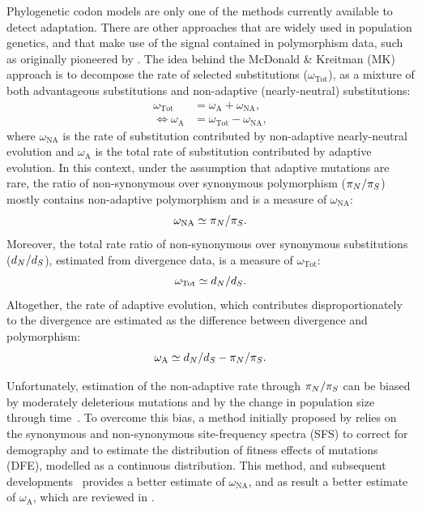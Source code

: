 Phylogenetic codon models are only one of the methods currently available to detect adaptation.
There are other approaches that are widely used in population genetics, and that make use of the signal contained in polymorphism data, such as originally pioneered by \citet{McDonald1991}.
The idea behind the McDonald \& Kreitman (MK) approach is to decompose the rate of selected substitutions ($\omega_{\text{Tot}}$), as a mixture of both advantageous substitutions and non-adaptive (nearly-neutral) substitutions:
\begin{align}
    \omega_{\text{Tot}} & = \omega_{\text{A}} + \omega_{\text{NA}}, \\
    \iff \omega_{\text{A}} & = \omega_{\text{Tot}} - \omega_{\text{NA}},
\end{align}
where $\omega_{\text{NA}}$ is the rate of substitution contributed by non-adaptive nearly-neutral evolution and $\omega_{\text{A}}$ is the total rate of substitution contributed by adaptive evolution.
In this context, under the assumption that adaptive mutations are rare, the ratio of non-synonymous over synonymous polymorphism ($\pi_N / \pi_S$) mostly contains non-adaptive polymorphism and is a measure of $\omega_{\text{NA}}$:
\begin{equation}
    \omega_{\text{NA}} \simeq \pi_N / \pi_S.
\end{equation}
Moreover, the total rate ratio of non-synonymous over synonymous substitutions ($d_N / d_S$), estimated from divergence data, is a measure of $\omega_{\text{Tot}}$:
\begin{equation}
    \omega_{\text{Tot}} \simeq d_N / d_S.
\end{equation}
Altogether, the rate of adaptive evolution, which contributes disproportionately to the divergence are estimated as the difference between divergence and polymorphism:
\begin{equation}
    \omega_{\text{A}} \simeq d_N / d_S - \pi_N / \pi_S.
\end{equation}

Unfortunately, estimation of the non-adaptive rate through $\pi_N / \pi_S$ can be biased by moderately deleterious mutations and by the change in population size through time~\citep{eyre-walker_changing_2002}.
To overcome this bias, a method initially proposed by \citet{eyre-walker_estimating_2009, Galtier2016} relies on the synonymous and non-synonymous site-frequency spectra (\acrshort{SFS}) to correct for demography and to estimate the distribution of fitness effects of mutations (\acrshort{DFE}), modelled as a continuous distribution.
This method, and subsequent developments~\citep{Galtier2016} provides a better estimate of $\omega_{\text{NA}}$, and as result a better estimate of $\omega_{\text{A}}$, which are reviewed in \citet{Moutinho2019a}.

